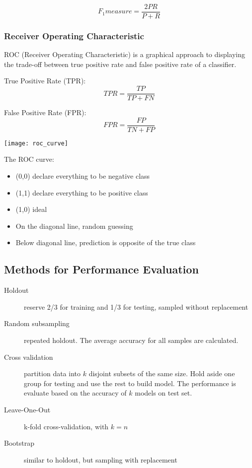 \begin{multicols*}{2}
$$F_1measure=\frac{2PR}{P+R}$$

\subsubsection{Receiver Operating Characteristic}

\noindent ROC (Receiver Operating Characteristic) is a graphical approach to displaying the trade-off between true positive rate and false positive rate of a classifier.

\noindent True Positive Rate (TPR):
$$TPR = \frac{TP}{TP+FN}$$

\noindent False Positive Rate (FPR):
$$FPR = \frac{FP}{TN + FP}$$

\begin{center}
\texttt{[image: roc\_curve]}
\end{center}

\noindent The ROC curve:

\begin{itemize}
    \item (0,0) declare everything to be negative class
    \item (1,1) declare everything to be positive class
    \item (1,0) ideal
    \item On the diagonal line, random guessing
    \item Below diagonal line, prediction is opposite of the true class
\end{itemize}

\subsection{Methods for Performance Evaluation}

\begin{description}
    \item[Holdout] reserve 2/3 for training and 1/3 for testing, sampled without replacement
    \item[Random subsampling] repeated holdout. The average accuracy for all samples are calculated. 
    \item[Cross validation] partition data into $k$ disjoint subsets of the same size. Hold aside one group for testing and use the rest to build model. The performance is evaluate based on the accuracy of $k$ models on test set. 
    \item[Leave-One-Out] k-fold cross-validation, with $k=n$
    \item[Bootstrap] similar to holdout, but sampling with replacement
\end{description}

\end{multicols*}